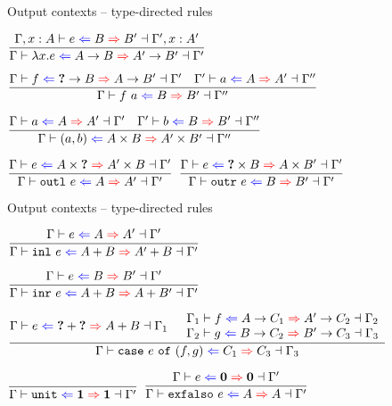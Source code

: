\documentclass{beamer}
\newcommand{\Fun}[2]{#1 \to #2}
\newcommand{\Prod}[2]{#1 \times #2}
\newcommand{\Sum}[2]{#1 + #2}
\newcommand{\Unit}{\textbf{1}}
\newcommand{\Empty}{\textbf{0}}
\newcommand{\fun}[2]{\lambda #1. #2}
\newcommand{\app}[2]{#1\ #2}
\newcommand{\pair}[2]{(#1, #2)}
\newcommand{\outl}[1]{\texttt{outl}\ #1}
\newcommand{\outr}[1]{\texttt{outr}\ #1}
\newcommand{\inl}[1]{\texttt{inl}\ #1}
\newcommand{\inr}[1]{\texttt{inr}\ #1}
\newcommand{\case}[3]{\texttt{case}\ #1\ \texttt{of}\ (#2, #3)}
\newcommand{\unit}{\texttt{unit}}
\newcommand{\exfalso}[1]{\texttt{exfalso}\ #1}
\newcommand{\rulename}[1]{\textsc{\footnotesize{#1}}}
\newcommand{\infrule}[3][]{\displaystyle \frac{#2}{#3} \rulename{#1}}
\newcommand{\extend}[3]{#1, #2 : #3}
\begin{document}
\begin{frame}{Output contexts -- type-directed rules}

\begin{center}
  $\infrule{\fulloutctx{\extend{\Gamma}{x}{A}}{e}{B}{B'}{\extend{\Gamma'}{x}{A'}}}{\outctx{\fun{x}{e}}{\Fun{A}{B}}{\Fun{A'}{B'}}}$

  \vspace{1em}

  $\infrule{\fulloutctx{\Gamma}{f}{\Fun{\Hole}{B}}{\Fun{A}{B'}}{\Gamma'} \quad \fulloutctx{\Gamma'}{a}{A}{A'}{\Gamma''}}{\fulloutctx{\Gamma}{\app{f}{a}}{B}{B'}{\Gamma''}}$

  \vspace{1em}

  $\infrule{\fulloutctx{\Gamma}{a}{A}{A'}{\Gamma'} \quad \fulloutctx{\Gamma'}{b}{B}{B'}{\Gamma''}}{\fulloutctx{\Gamma}{\pair{a}{b}}{\Prod{A}{B}}{\Prod{A'}{B'}}{\Gamma''}}$

  \vspace{1em}

  $\infrule{\outctx{e}{\Prod{A}{\Hole}}{\Prod{A'}{B}}}{\outctx{\outl{e}}{A}{A'}}$
  \quad
  $\infrule{\outctx{e}{\Prod{\Hole}{B}}{\Prod{A}{B'}}}{\outctx{\outr{e}}{B}{B'}}$
\end{center}

\end{frame}

\begin{frame}{Output contexts -- type-directed rules}

\begin{center}
  $\infrule{\outctx{e}{A}{A'}}{\outctx{\inl{e}}{\Sum{A}{B}}{\Sum{A'}{B}}}$

  \vspace{2em}

  $\infrule{\outctx{e}{B}{B'}}{\outctx{\inr{e}}{\Sum{A}{B}}{\Sum{A}{B'}}}$

  \vspace{2em}

  $\infrule{\fulloutctx{\Gamma}{e}{\Sum{\Hole}{\Hole}}{\Sum{A}{B}}{\Gamma_1} \quad \begin{array}{c} \fulloutctx{\Gamma_1}{f}{\Fun{A}{C_1}}{\Fun{A'}{C_2}}{\Gamma_2} \\ \fulloutctx{\Gamma_2}{g}{\Fun{B}{C_2}}{\Fun{B'}{C_3}}{\Gamma_3} \end{array}}{\fulloutctx{\Gamma}{\case{e}{f}{g}}{C_1}{C_3}{\Gamma_3}}$

  \vspace{2em}

  $\infrule{}{\outctx{\unit}{\Unit}{\Unit}}$
  \quad
  $\infrule{\outctx{e}{\Empty}{\Empty}}{\outctx{\exfalso{e}}{A}{A}}$
\end{center}

\end{frame}
\end{document}
